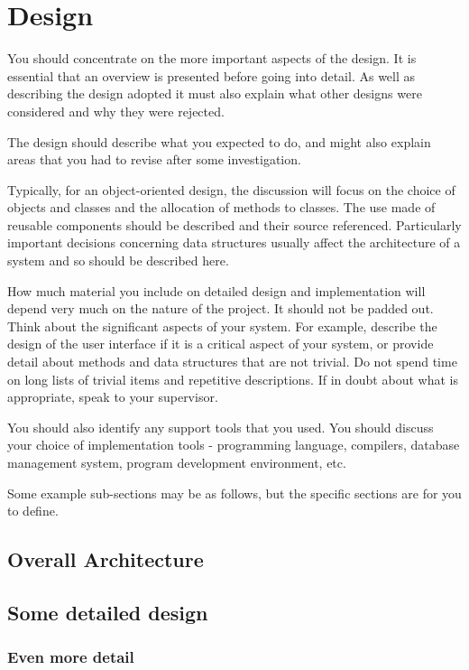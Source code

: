 \chapter{Design}

You should concentrate on the more important aspects of the design. It is essential that an overview is presented before going into detail. As well as describing the design adopted it must also explain what other designs were considered and why they were rejected.

The design should describe what you expected to do, and might also explain areas that you had to revise after some investigation.

Typically, for an object-oriented design, the discussion will focus on the choice of objects and classes and the allocation of methods to classes. The use made of reusable components should be described and their source referenced. Particularly important decisions concerning data structures usually affect the architecture of a system and so should be described here.

How much material you include on detailed design and implementation will depend very much on the nature of the project. It should not be padded out. Think about the significant aspects of your system. For example, describe the design of the user interface if it is a critical aspect of your system, or provide detail about methods and data structures that are not trivial. Do not spend time on long lists of trivial items and repetitive descriptions. If in doubt about what is appropriate, speak to your supervisor.

You should also identify any support tools that you used. You should discuss your choice of implementation tools - programming language, compilers, database management system, program development environment, etc.

Some example sub-sections may be as follows, but the specific sections are for you to define.

\section{Overall Architecture}

\section{Some detailed design}

\subsection{Even more detail}

